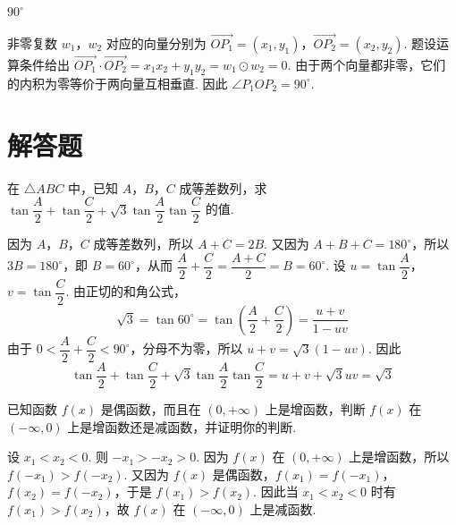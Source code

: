 \begin{answer}
\(90^{\circ}\)
\end{answer}

\begin{solution}
非零复数 \(w_{1}\)，\(w_{2}\) 对应的向量分别为 \(\overrightarrow{OP_{1}}=(x_{1},y_{1})\)，\(\overrightarrow{OP_{2}}=(x_{2},y_{2})\). 题设运算条件给出
 \(\overrightarrow{OP_{1}}\cdot\overrightarrow{OP_{2}}=x_{1}x_{2}+y_{1}y_{2}=w_{1}\odot w_{2}=0\).
由于两个向量都非零，它们的内积为零等价于两向量互相垂直. 因此 \(\angle P_{1}OP_{2}=90^{\circ}\).
\end{solution}

\section{解答题}

\begin{problem}
在 \(\triangle ABC\) 中，已知 \(A\)，\(B\)，\(C\) 成等差数列，求 \(\tan\dfrac{A}{2}+\tan\dfrac{C}{2}+\sqrt{3}\tan\dfrac{A}{2}\tan\dfrac{C}{2}\) 的值.
\end{problem}

\begin{solution}
因为 \(A\)，\(B\)，\(C\) 成等差数列，所以 \(A+C=2B\). 又因为 \(A+B+C=180^{\circ}\)，所以 \(3B=180^{\circ}\)，即 \(B=60^{\circ}\)，从而
 \(\dfrac{A}{2}+\dfrac{C}{2}=\dfrac{A+C}{2}=B=60^{\circ}\).
设 \(u=\tan\dfrac{A}{2}\)，\(v=\tan\dfrac{C}{2}\). 由正切的和角公式，
\[
\sqrt{3}=\tan60^{\circ}=\tan\left(\dfrac{A}{2}+\dfrac{C}{2}\right)=\dfrac{u+v}{1-uv}
\]
由于 \(0<\dfrac{A}{2}+\dfrac{C}{2}<90^{\circ}\)，分母不为零，所以 \(u+v=\sqrt{3}(1-uv)\). 因此
\[
\tan\dfrac{A}{2}+\tan\dfrac{C}{2}+\sqrt{3}\tan\dfrac{A}{2}\tan\dfrac{C}{2}=u+v+\sqrt{3}uv=\sqrt{3}
\]
\end{solution}

\begin{problem}
已知函数 \(f(x)\) 是偶函数，而且在 \((0,+\infty)\) 上是增函数，判断 \(f(x)\) 在 \((-\infty,0)\) 上是增函数还是减函数，并证明你的判断.
\end{problem}

\begin{solution}
设 \(x_{1}<x_{2}<0\). 则 \(-x_{1}>-x_{2}>0\). 因为 \(f(x)\) 在 \((0,+\infty)\) 上是增函数，所以 \(f(-x_{1})>f(-x_{2})\). 又因为 \(f(x)\) 是偶函数，\(f(x_{1})=f(-x_{1})\)，\(f(x_{2})=f(-x_{2})\)，于是 \(f(x_{1})>f(x_{2})\). 因此当 \(x_{1}<x_{2}<0\) 时有 \(f(x_{1})>f(x_{2})\)，故 \(f(x)\) 在 \((-\infty,0)\) 上是减函数.
\end{solution}

